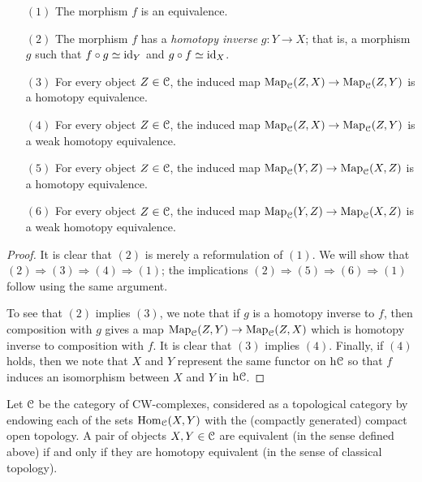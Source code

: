 \begin{Didn't Read}
\begin{proposition}
\begin{itemize}
\item[$(1)$] The morphism $f$ is an equivalence.

\item[$(2)$] The morphism $f$ has a {\it homotopy inverse} $g: Y
\rightarrow X$; that is, a morphism $g$ such that $f \circ g
\simeq \operatorname{id}_Y$ and $g \circ f \simeq \operatorname{id}_X$.

\item[$(3)$] For every object $Z \in \operatorname{\mathcal{C}}$, the induced map
$\operatorname{{Map}}_{\operatorname{\mathcal{C}}}(Z,X) \rightarrow \operatorname{{Map}}_{\operatorname{\mathcal{C}}}(Z,Y)$ is a homotopy
equivalence.

\item[$(4)$] For every object $Z \in \operatorname{\mathcal{C}}$, the induced map
$\operatorname{{Map}}_{\operatorname{\mathcal{C}}}(Z,X) \rightarrow \operatorname{{Map}}_{\operatorname{\mathcal{C}}}(Z,Y)$ is a weak
homotopy equivalence.

\item[$(5)$] For every object $Z \in \operatorname{\mathcal{C}}$, the induced map
$\operatorname{{Map}}_{\operatorname{\mathcal{C}}}(Y,Z) \rightarrow \operatorname{{Map}}_{\operatorname{\mathcal{C}}}(X,Z)$ is a homotopy
equivalence.

\item[$(6)$] For every object $Z \in \operatorname{\mathcal{C}}$, the induced map
$\operatorname{{Map}}_{\operatorname{\mathcal{C}}}(Y,Z) \rightarrow \operatorname{{Map}}_{\operatorname{\mathcal{C}}}(X,Z)$ is a weak
homotopy equivalence.
\end{itemize}
\end{proposition}

\begin{proof}
It is clear that $(2)$ is merely a reformulation of $(1)$. We will
show that $(2) \Rightarrow (3) \Rightarrow (4) \Rightarrow (1)$;
the implications $(2) \Rightarrow (5) \Rightarrow (6) \Rightarrow
(1)$ follow using the same argument.

To see that $(2)$ implies $(3)$, we note that if $g$ is a homotopy
inverse to $f$, then composition with $g$ gives a map
$\operatorname{{Map}}_{\operatorname{\mathcal{C}}}(Z,Y) \rightarrow \operatorname{{Map}}_{\operatorname{\mathcal{C}}}(Z,X)$ which is
homotopy inverse to composition with $f$. It is clear that $(3)$
implies $(4)$. Finally, if $(4)$ holds, then we note that $X$ and
$Y$ represent the same functor on $\rm{h} \it{\operatorname{\mathcal{C}}}$ so that $f$ induces an
isomorphism between $X$ and $Y$ in $\rm{h} \it{\operatorname{\mathcal{C}}}$.
\end{proof}

\begin{example}
Let $\operatorname{\mathcal{C}}$ be the category of CW-complexes, considered as a topological category by endowing
each of the sets $\operatorname{Hom}_{\operatorname{\mathcal{C}}}(X,Y)$ with the (compactly generated) compact open topology. A pair of objects $X,Y \in \operatorname{\mathcal{C}}$ are equivalent (in the sense defined above) if and only if they are homotopy equivalent (in the sense of classical topology).
\end{example}


\end{Didn't Read}
